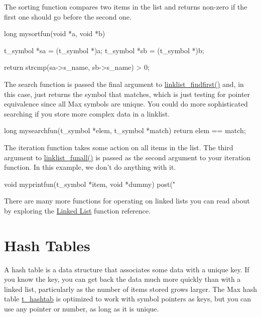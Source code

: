 The sorting function compares two items in the list and returns non-\/zero if the first one should go before the second one.


\begin{DoxyCode}
    long mysortfun(void *a, void *b)
    {
        t_symbol *sa = (t_symbol *)a;
        t_symbol *sb = (t_symbol *)b;

        return strcmp(sa->s_name, sb->s_name) > 0;
    }
\end{DoxyCode}


The search function is passed the final argument to \hyperlink{group__linklist_gab7f3c26cb704c460892818b89a1ab004}{linklist\_\-findfirst()} and, in this case, just returns the symbol that matches, which is just testing for pointer equivalence since all Max symbols are unique. You could do more sophisticated searching if you store more complex data in a linklist.


\begin{DoxyCode}
    long mysearchfun(t_symbol *elem, t_symbol *match)
    {
        return elem == match;
    }
\end{DoxyCode}


The iteration function takes some action on all items in the list. The third argument to \hyperlink{group__linklist_ga6f4496ef6dc1d6d121acf25d7cd5f946}{linklist\_\-funall()} is passed as the second argument to your iteration function. In this example, we don't do anything with it.


\begin{DoxyCode}
    void myprintfun(t_symbol *item, void *dummy)
    {
        post("%
    }
\end{DoxyCode}


There are many more functions for operating on linked lists you can read about by exploring the \hyperlink{group__linklist}{Linked List} function reference.\hypertarget{chapter_datastructures_chapter_datastructures_hashtabs}{}\section{Hash Tables}\label{chapter_datastructures_chapter_datastructures_hashtabs}
A hash table is a data structure that associates some data with a unique key. If you know the key, you can get back the data much more quickly than with a linked list, particularly as the number of items stored grows larger. The Max hash table \hyperlink{structt__hashtab}{t\_\-hashtab} is optimized to work with symbol pointers as keys, but you can use any pointer or number, as long as it is unique.

